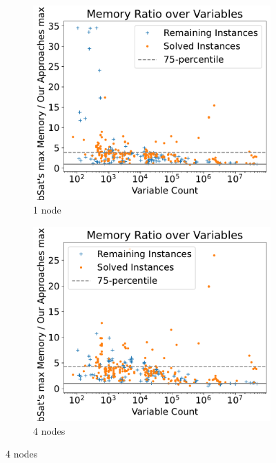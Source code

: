 \documentclass[12pt,a4paper,twoside]{scrartcl}
\numberwithin{equation}{section}
\begin{document}
\begin{figure}[!h]
  \center
  \begin{subfigure}[c]{.45\textwidth}
    \center
    \includegraphics[scale=.45]{plots/1node_compare/mem_ratio_over_vars.pdf}
    \caption{1 node}
    \label{fig:memRatiosVars1node}
  \end{subfigure}
  \begin{subfigure}[c]{.45\textwidth}
    \center
    \includegraphics[scale=.45]{plots/4node_compare/mem_ratio_over_vars.pdf}
    \caption{4 nodes}
    \label{fig:memRatiosVars4node}
  \end{subfigure}

\end{figure}
\end{document}
